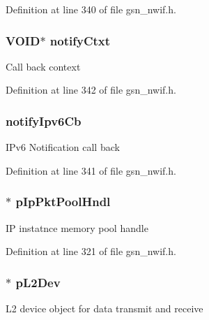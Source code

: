 Definition at line 340 of file gsn\_\-nwif.h.

\hypertarget{a00167_a7b0f7b7dc7eadb023bb4b9615423574b}{
\subsubsection[{notifyCtxt}]{\setlength{\rightskip}{0pt plus 5cm}VOID$\ast$ {\bf notifyCtxt}}}
\label{a00167_a7b0f7b7dc7eadb023bb4b9615423574b}
Call back context 

Definition at line 342 of file gsn\_\-nwif.h.

\hypertarget{a00167_a780cfacd3edf39c4deef8f1ab64e242a}{
\subsubsection[{notifyIpv6Cb}]{ {\bf notifyIpv6Cb}}}
\label{a00167_a780cfacd3edf39c4deef8f1ab64e242a}
IPv6 Notification call back 

Definition at line 341 of file gsn\_\-nwif.h.

\hypertarget{a00167_a4cdcdc7a80f5e9b124e3cdff24cdcaec}{
\subsubsection[{pIpPktPoolHndl}]{$\ast$ {\bf pIpPktPoolHndl}}}
\label{a00167_a4cdcdc7a80f5e9b124e3cdff24cdcaec}
IP instatnce memory pool handle 

Definition at line 321 of file gsn\_\-nwif.h.

\hypertarget{a00167_a26c032e68793c08c6f4c3509dee1e4f2}{
\subsubsection[{pL2Dev}]{$\ast$ {\bf pL2Dev}}}
\label{a00167_a26c032e68793c08c6f4c3509dee1e4f2}
L2 device object for data transmit and receive 

